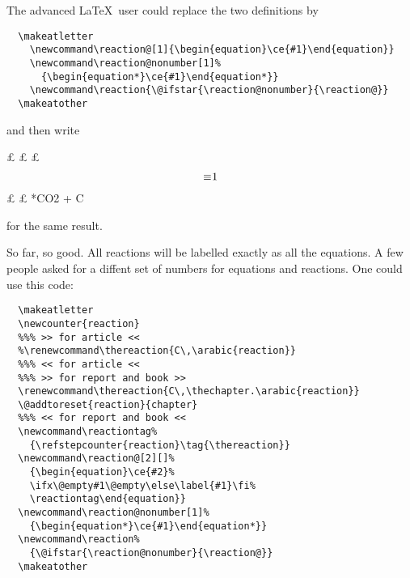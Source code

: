 \documentclass[a4paper,notitlepage]{scrreprt}
\begin{document}
\noindent
The advanced \LaTeX\ user could replace the two definitions by
\begin{Verbatim}
  \makeatletter
    \newcommand\reaction@[1]{\begin{equation}\ce{#1}\end{equation}}
    \newcommand\reaction@nonumber[1]%
      {\begin{equation*}\ce{#1}\end{equation*}}
    \newcommand\reaction{\@ifstar{\reaction@nonumber}{\reaction@}}
  \makeatother
\end{Verbatim}
and then write
\begin{SideBySideExample}[xrightmargin=5cm]
  £\makeatletter
  £  \newcommand\reaction@[1]{\begin{equation}\ce{#1}\end{equation}}
  £  \newcommand\reaction@nonumber[1]%
  £    {\begin{equation*}\ce{#1}\end{equation*}}
  £  \newcommand\reaction{\@ifstar{\reaction@nonumber}{\reaction@}}
  £\makeatother
  \reaction{CO2 + C}
  \reaction*{CO2 + C}
\end{SideBySideExample}

\smallskip

\noindent
for the same result. 

\minisec{}

So far, so good. All reactions will be labelled exactly as all the equations. A few people asked for a diffent set of numbers for equations and reactions. One could use this code:

\begin{Verbatim}
  \makeatletter
  \newcounter{reaction}
  %%% >> for article <<
  %\renewcommand\thereaction{C\,\arabic{reaction}}
  %%% << for article <<
  %%% >> for report and book >>
  \renewcommand\thereaction{C\,\thechapter.\arabic{reaction}}
  \@addtoreset{reaction}{chapter}
  %%% << for report and book <<
  \newcommand\reactiontag%
    {\refstepcounter{reaction}\tag{\thereaction}}
  \newcommand\reaction@[2][]%
    {\begin{equation}\ce{#2}%
    \ifx\@empty#1\@empty\else\label{#1}\fi%
    \reactiontag\end{equation}}
  \newcommand\reaction@nonumber[1]%
    {\begin{equation*}\ce{#1}\end{equation*}}
  \newcommand\reaction%
    {\@ifstar{\reaction@nonumber}{\reaction@}}
  \makeatother
\end{Verbatim}
\end{document}
